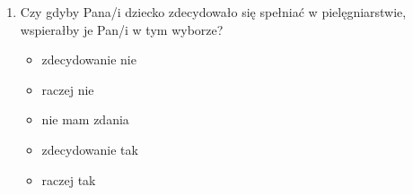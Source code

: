 \documentclass[a4paper,12pt,twoside,openright]{mwrep}
\begin{document}
\begin{enumerate}[label=\arabic*)]
			\item{Czy gdyby Pana/i dziecko zdecydowało się spełniać w pielęgniarstwie, wspierałby je Pan/i  w tym wyborze?}
		\begin{itemize}
			\item{zdecydowanie nie}
			\item{raczej nie}
			\item{nie mam zdania}
			\item{zdecydowanie tak}
			\item{raczej tak}
		\end{itemize}
		\vspace{\baselineskip}
		
	
		
		
		
		
\end{enumerate}


\end{document}
